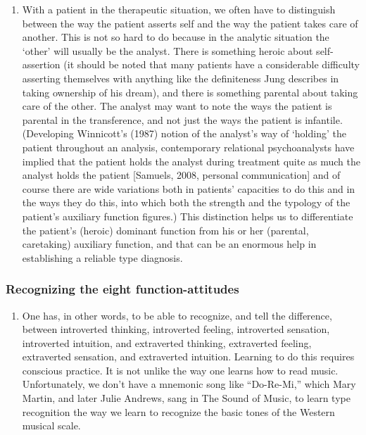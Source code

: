 \begin{enumerate}
\item {} With
a patient in the therapeutic situation, we often have to distinguish between
the way the patient asserts self and the way the patient takes care of another.
This is not so hard to do because in the analytic situation the ‘other’ will
usually be the analyst. There is something heroic about self-assertion (it
should be noted that many patients have a considerable difficulty asserting
themselves with anything like the definiteness Jung describes in taking
ownership of his dream), and there is something parental about taking care of
the other. The analyst may want to note the ways the patient is parental in the
transference, and not just the ways the patient is infantile. (Developing
Winnicott’s (1987) notion of the analyst’s way of ‘holding’ the patient
throughout an analysis, contemporary relational psychoanalysts have implied
that the patient holds the analyst during treatment quite as much the analyst
holds the patient [Samuels, 2008, personal communication] and of course there
are wide variations both in patients’ capacities to do this and in the ways
they do this, into which both the strength and the typology of the patient’s
auxiliary function figures.) This distinction helps us to differentiate the
patient’s (heroic) dominant function from his or her (parental, caretaking)
auxiliary function, and that can be an enormous help in establishing a reliable
type diagnosis.

\end{enumerate}

\subsubsection{Recognizing the eight function-attitudes}

\begin{enumerate}

\item {} One
has, in other words, to be able to recognize, and tell the difference, between
introverted thinking, introverted feeling, introverted sensation, introverted
intuition, and extraverted thinking, extraverted feeling, extraverted
sensation, and extraverted intuition. Learning to do this requires conscious
practice. It is not unlike the way one learns how to read music. Unfortunately,
we don’t have a mnemonic song like “Do-Re-Mi,” which Mary Martin, and later
Julie Andrews, sang in The Sound of Music, to learn type recognition the way we
learn to recognize the basic tones of the Western musical scale.

\end{enumerate}

